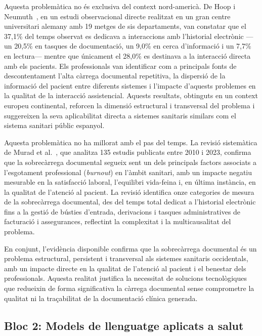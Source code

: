 \documentclass[11pt,a4paper]{article}
\begin{document}
Aquesta problemàtica no és exclusiva del context nord-americà. De Hoop i Neumuth~\cite{dehoop2021ehr}, en un estudi observacional directe realitzat en un gran centre universitari alemany amb 19 metges de sis departaments, van constatar que el 37,1\% del temps observat es dedicava a interaccions amb l'historial electrònic ---un 20,5\% en tasques de documentació, un 9,0\% en cerca d'informació i un 7,7\% en lectura--- mentre que únicament el 28,0\% es destinava a la interacció directa amb els pacients. Els professionals van identificar com a principals fonts de descontentament l'alta càrrega documental repetitiva, la dispersió de la informació del pacient entre diferents sistemes i l'impacte d'aquests problemes en la qualitat de la interacció assistencial. Aquests resultats, obtinguts en un context europeu continental, reforcen la dimensió estructural i transversal del problema i suggereixen la seva aplicabilitat directa a sistemes sanitaris similars com el sistema sanitari públic espanyol.

Aquesta problemàtica no ha millorat amb el pas del temps. La revisió sistemàtica de Murad et al.~\cite{murad2024documentation}, que analitza 135 estudis publicats entre 2010 i 2023, confirma que la sobrecàrrega documental segueix sent un dels principals factors associats a l'esgotament professional (\textit{burnout}) en l'àmbit sanitari, amb un impacte negatiu mesurable en la satisfacció laboral, l'equilibri vida-feina i, en última instància, en la qualitat de l'atenció al pacient. La revisió identifica onze categories de mesura de la sobrecàrrega documental, des del temps total dedicat a l'historial electrònic fins a la gestió de bústies d'entrada, derivacions i tasques administratives de facturació i assegurances, reflectint la complexitat i la multicausalitat del problema.

En conjunt, l'evidència disponible confirma que la sobrecàrrega documental és un problema estructural, persistent i transversal als sistemes sanitaris occidentals, amb un impacte directe en la qualitat de l'atenció al pacient i el benestar dels professionals. Aquesta realitat justifica la necessitat de solucions tecnològiques que redueixin de forma significativa la càrrega documental sense comprometre la qualitat ni la traçabilitat de la documentació clínica generada.


\subsection*{Bloc 2: Models de llenguatge aplicats a salut}
\end{document}
